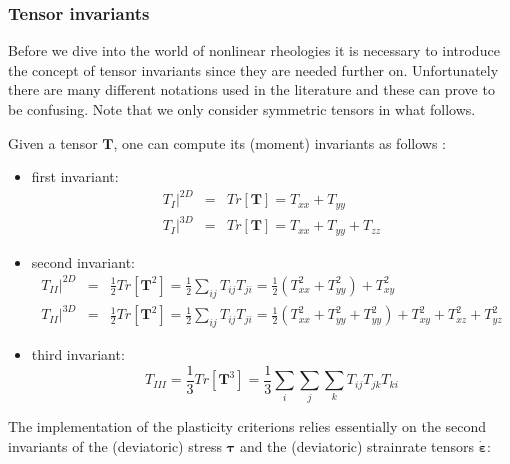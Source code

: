 
\subsubsection{Tensor invariants}\label{sec:invariants}

Before we dive into the world of nonlinear rheologies it is necessary to introduce the concept of tensor 
invariants since they are needed further on. 
Unfortunately there are many different notations used in the literature and these can prove to be 
confusing. Note that we only consider symmetric tensors in what follows.

Given a tensor $\bm{T}$,  one can compute its (moment) invariants as follows \cite[p.339]{reddybook2}: 
\begin{itemize}
\item first invariant:
\begin{eqnarray}
T_I|^{2D} &=& Tr[\bm{T}] = T_{xx} + T_{yy} \nonumber\\
T_I|^{3D} &=& Tr[\bm{T}] = T_{xx} + T_{yy} + T_{zz} \nonumber
\end{eqnarray}
\item second invariant:
\begin{eqnarray}
T_{II}|^{2D} &=& \frac{1}{2} Tr[{\bm{T}^2}] = \frac{1}{2} \sum_{ij} T_{ij} T_{ji} = \frac{1}{2} (T_{xx}^2 + T_{yy}^2) + T_{xy}^2 \nonumber\\
T_{II}|^{3D} &=& \frac{1}{2} Tr[{\bm{T}^2}] = \frac{1}{2} \sum_{ij} T_{ij} T_{ji} = \frac{1}{2} (T_{xx}^2 + T_{yy}^2 + T_{yy}^2) + T_{xy}^2 + T_{xz}^2 + T_{yz}^2 \nonumber
\end{eqnarray}
\item third invariant: 
\[
T_{III} = \frac{1}{3} Tr[{\bm{T}^3}]  = \frac{1}{3}\sum_i\sum_j \sum_k T_{ij} T_{jk} T_{ki} 
\]
\end{itemize}


The implementation of the plasticity criterions relies essentially 
on the second invariants of the (deviatoric) stress ${\bm \tau}$ and the (deviatoric) strainrate tensors $\dot{\bm \varepsilon}$:

